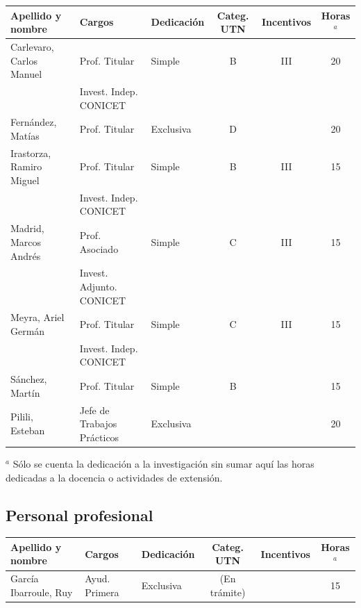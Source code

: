 \documentclass[a4paper,11pt,twoside,final,titlepage,onecolumn,openright]{report}
\begin{document}
{\small
	\begin{tabular}{l l l c c c}
		\toprule
		Apellido y nombre        & Cargos                     & Dedicación & Categ. UTN & Incentivos & Horas$^a$ \\
		\midrule
		Carlevaro, Carlos Manuel & Prof. Titular              & Simple     & B          & III        & 20        \\
		                         & Invest. Indep. CONICET     &            &            &            &           \\
		Fernández, Matías        & Prof. Titular              & Exclusiva  & D          &            & 20        \\
		Irastorza, Ramiro Miguel & Prof. Titular              & Simple     & B          & III        & 15        \\
		                         & Invest. Indep. CONICET     &            &            &            &           \\
		Madrid, Marcos Andrés    & Prof. Asociado              & Simple     & C          & III        & 15        \\
		                         & Invest. Adjunto. CONICET     &            &            &            &           \\
		Meyra, Ariel Germán      & Prof. Titular              & Simple     & C          & III        & 15        \\
		                         & Invest. Indep. CONICET     &            &            &            &           \\
		Sánchez, Martín          & Prof. Titular              & Simple     & B          &            & 15        \\
		Pilili, Esteban          & Jefe de Trabajos Prácticos & Exclusiva     &            &            & 20        \\
		\bottomrule
	\end{tabular}
}

\normalsize
\vspace{0.5cm}
$^a$ Sólo se cuenta la dedicación a la investigación sin sumar aquí las horas dedicadas a la docencia o actividades de extensión.

\subsection{Personal profesional}
\begin{tabular}{l l l c c c}
	\toprule
	Apellido y nombre     & Cargos        & Dedicación & Categ. UTN   & Incentivos & Horas$^a$ \\
	\midrule
	García Ibarroule, Ruy & Ayud. Primera & Exclusiva  & (En trámite) &            & 15        \\
	\bottomrule
\end{tabular}
\end{document}
